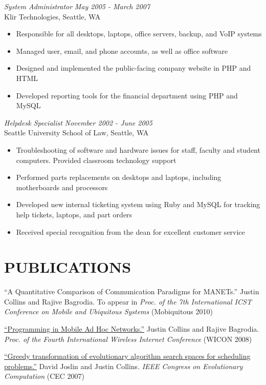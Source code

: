 \documentclass[margin]{res}
\begin{document}
\begin{resume}
{\sl System Administrator} \hfill \textit{May 2005 - March 2007} \\
		Klir Technologies, Seattle, WA 
		\begin{itemize}  \itemsep -2pt %
		\item Responsible for all desktops, laptops, office servers, backup, and VoIP systems
		\item Managed user, email, and phone accounts, as well as office software
		\item Designed and implemented the public-facing company website in PHP and HTML
		\item Developed reporting tools for the financial department using PHP and MySQL
		\end{itemize}

{\sl Helpdesk Specialist} \hfill \textit{November 2002 - June 2005} \\
		Seattle University School of Law, Seattle, WA 
		\begin{itemize}  \itemsep -2pt %
		\item Troubleshooting of software and hardware issues for staff, faculty and student computers. Provided classroom technology support
		\item Performed parts replacements on desktops and laptops, including motherboards and processors
		\item Developed new internal ticketing system using Ruby and MySQL for tracking help tickets, laptops, and part orders
		\item Received special recognition from the dean for excellent customer service
		\end{itemize}

		\section{PUBLICATIONS}

		``A Quantitative Comparison of Communication Paradigms for MANETs.'' Justin Collins and Rajive Bagrodia.
			To appear in {\it Proc. of the 7th International ICST Conference on Mobile and Ubiquitous Systems} (Mobiquitous 2010)

		\href{http://cs.ucla.edu/~collins/documents/Justin_Collins-WICON08.pdf}{``Programming in Mobile Ad Hoc Networks.''} Justin Collins and Rajive Bagrodia. 
			{\it Proc. of the Fourth International Wireless Internet Conference} (WICON 2008)

		\href{http://cs.ucla.edu/~collins/documents/Joslin_Collins-Greedy_Transformations_of_Search_Spaces.pdf}{``Greedy transformation of evolutionary algorithm search spaces for scheduling problems.''} David Joslin and Justin Collins. 
		{\it IEEE Congress on Evolutionary Computation} (CEC 2007)


\end{resume}
\end{document}
